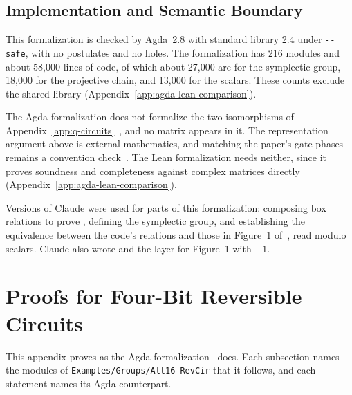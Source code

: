 \documentclass[acmsmall,screen,nonacm]{acmart}
\begin{document}


\subsection{Implementation and Semantic Boundary}\label{app:q-discussion}

This formalization is checked by Agda~2.8 with standard library 2.4 under \texttt{-{}-safe}, with no postulates and no holes. The formalization has 216 modules and about 58{,}000 lines of code, of which about 27{,}000 are for the symplectic group, 18{,}000 for the projective chain, and 13{,}000 for the scalars. These counts exclude the shared library (Appendix~\ref{app:agda-lean-comparison}).

The Agda formalization does not formalize the two isomorphisms of Appendix~\ref{app:q-circuits}~\cite{gross2006hudson,gurevich2007geometric}, and no matrix appears in it. The representation argument above is external mathematics, and matching the paper's gate phases remains a convention check~\cite{bian2026qupit,neuhauser2002metaplectic}. The Lean formalization needs neither, since it proves soundness and completeness against complex matrices directly (Appendix~\ref{app:agda-lean-comparison}).

Versions of Claude were used for parts of this formalization: composing box relations to prove , defining the symplectic group, and establishing the equivalence between the code's relations and those in Figure~1 of~\quditcite{}, read modulo scalars. Claude also wrote  and the layer for Figure~1 with $-1$.


\fi

\iffalse
\section{Proofs for Four-Bit Reversible Circuits}\label{app:xcxccx}

This appendix proves  as the Agda formalization~\cite{equacert2026artifact} does. Each subsection names the modules of \texttt{Examples/Groups/Alt16-RevCir} that it follows, and each statement names its Agda counterpart.
\end{document}

